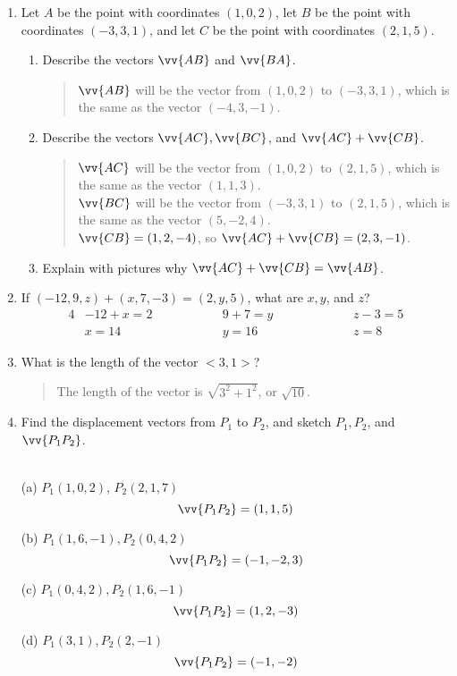 \documentclass{hw}
\begin{document}
\begin{enumerate}
\item
Let $A$ be the point with coordinates $(1, 0, 2)$, let $B$ be the point with coordinates $(−3, 3, 1)$, and
let $C$ be the point with coordinates $(2, 1, 5)$.
\begin{enumerate}
\item Describe the vectors $\vv{AB}$ and $\vv{BA}$.
\begin{quote}
$\vv{AB}$ will be the vector from $(1,0,2)$ to $(−3, 3, 1)$, which is the same as the vector $(-4,3,-1)$.
\end{quote}
\item Describe the vectors $\vv{AC},\vv{BC}$, and $\vv{AC} + \vv{CB}$.
\begin{quote}
$\vv{AC}$ will be the vector from $(1,0,2)$ to $(2,1,5)$, which is the same as the vector $(1,1,3)$.\\
$\vv{BC}$ will be the vector from $(-3,3,1)$ to $(2,1,5)$, which is the same as the vector $(5,-2,4)$.\\
$\vv{CB} = (1,2,-4)$, so $\vv{AC} + \vv{CB} = (2,3,-1)$.
\end{quote}
\item Explain with pictures why $\vv{AC} + \vv{CB} = \vv{AB}$.
\vspace{3cm}
\end{enumerate}
\item If $(-12,9,z)+(x,7,-3) = (2,y,5)$, what are $x,y$, and $z$?
\begin{alignat*}{4}
& -12 + x = 2\qquad\qquad && 9 + 7 = y\qquad\qquad &&& z-3= 5\\
& x = 14 && y = 16 &&& z = 8
\end{alignat*}
\item What is the length of the vector $<3,1>$?
\begin{quote}
The length of the vector is $\sqrt{3^{2} + 1^{2}}$, or $\sqrt{10}$.
\end{quote}
\item Find the displacement vectors from $P_{1}$ to $P_{2}$, and sketch $P_{1}, P_{2}$, and
$\vv{P_{1}P_{2}}$.\\\\
\begin{minipage}{0.25\textwidth}
(a) $P_{1}(1,0,2)$, $P_{2}(2,1,7)$
$$\vv{P_{1}P_{2}} = (1,1,5)$$
\end{minipage}
\begin{minipage}{0.25\textwidth}
(b) $P_{1}(1,6,−1),P_{2}(0,4,2)$
$$\vv{P_{1}P_{2}} = (-1,-2,3)$$
\end{minipage}
\begin{minipage}{0.25\textwidth}
(c) $P_{1} (0,4,2), P_{2} (1,6,−1)$
$$\vv{P_{1}P_{2}} = (1,2,-3)$$
\end{minipage}
\begin{minipage}{0.25\textwidth}
(d) $P_{1}(3,1), P_{2}(2,−1)$
$$\vv{P_{1}P_{2}} = (-1,-2)$$
\end{minipage}


\end{enumerate}
\end{document}

